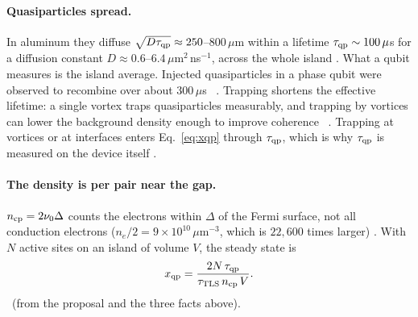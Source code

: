 \paragraph{Quasiparticles spread.} In aluminum they diffuse $\sqrt{D\tau_{\rm qp}}\approx250$--$800\,\mu$m within a lifetime $\tau_{\rm qp}\sim100\,\mu$s for a diffusion constant
$D\approx0.6$--$6.4\,\mu$m$^2$\,ns$^{-1}$, across the whole island \calc. What a qubit measures is the island average. Injected quasiparticles in a phase qubit were observed to recombine over about 300\,$\mu$s~\cite{Lenander2011} \observed. Trapping
shortens the effective lifetime: a single vortex traps quasiparticles measurably, and trapping by vortices can lower the background
density enough to improve coherence~\cite{Wang2014} \observed. Trapping at vortices or at interfaces enters Eq.~\eqref{eq:xqp} through
$\tau_{\rm qp}$, which is why $\tau_{\rm qp}$ is measured on the device itself \derived.
\paragraph{The density is per pair near the gap.} $n_{\rm cp}=2\nu_0\Delta$ counts the electrons within $\Delta$ of the Fermi surface, not all
conduction electrons ($n_e/2=9\times10^{10}\,\mu$m$^{-3}$, which is $22{,}600$ times larger) \calc.
With $N$ active sites on an island of volume $V$, the steady state is
\begin{equation}x_{\rm qp}=\frac{2N\,\tau_{\rm qp}}{\tau_{\rm TLS}\,n_{\rm cp}\,V}.\label{eq:xqp}\end{equation}
\derived\ (from the proposal and the three facts above).

